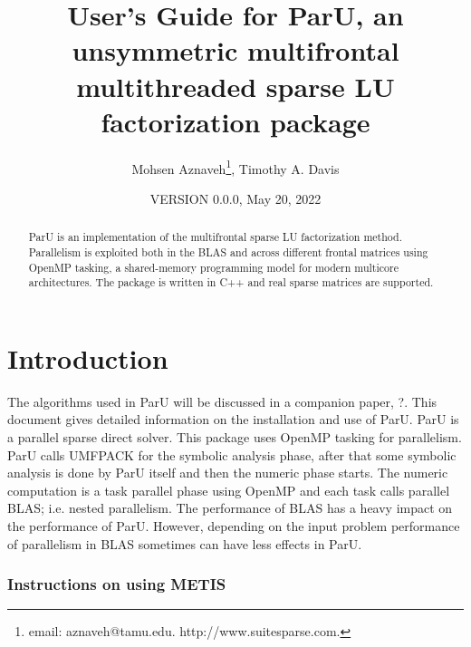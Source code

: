\documentclass[12pt]{article}
\title{User's Guide for ParU, an unsymmetric multifrontal multithreaded sparse
LU factorization package}
\author{Mohsen Aznaveh\thanks{
email: aznaveh@tamu.edu.
http://www.suitesparse.com.
},
Timothy A. Davis}
\date{VERSION 0.0.0, May 20, 2022}
\begin{document}
\maketitle

\begin{abstract}

ParU is an implementation of the multifrontal sparse LU factorization
method.  Parallelism is exploited both in the BLAS and across different frontal
matrices using OpenMP tasking, a shared-memory programming model for modern 
multicore architectures. The package is written in C++ and real sparse matrices 
are supported.

\end{abstract}

\maketitle

\section{Introduction}
\label{intro}

The algorithms used in ParU will be discussed in a companion paper,
?. This document gives detailed information on the installation
and use of ParU.
ParU is a parallel sparse direct solver. This package uses OpenMP
tasking for parallelism. ParU calls UMFPACK for the symbolic analysis phase,
after that some symbolic analysis is done by ParU itself and  then the numeric
phase starts. The numeric computation is a task parallel phase using OpenMP
and each task calls parallel BLAS; i.e. nested parallelism. 
The performance of BLAS has a heavy impact on the performance of ParU.
However, depending on the input problem performance of parallelism in BLAS 
sometimes can have less effects in ParU.


\subsubsection{Instructions on using METIS}
\end{document}

